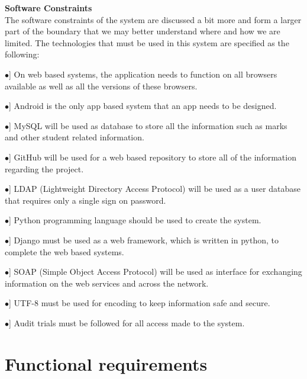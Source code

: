 \documentclass[12pt, a4paper]{scrartcl}
\newcommand{\tab}[1]{\hspace{.05\textwidth}\rlap{#1}}
\begin{document}
				\textbf{Software Constraints}\\
				The software constraints of the system are discussed a bit more and form a larger part of the boundary that we may better understand where and how we are limited. The technologies that must be used in this system are specified as the following:
				\begin{description}
					\item \tab [$\bullet$] On web based systems, the application needs to function on all browsers available as well as all the versions of these browsers.
					\item \tab [$\bullet$] Android is the only app based system that an app needs to be designed.
					\item \tab [$\bullet$] MySQL will be used as database to store all the information such as marks and other student related information.
					\item \tab [$\bullet$] GitHub will be used for a web based repository to store all of the information regarding the project.
					\item \tab [$\bullet$] LDAP (Lightweight Directory Access Protocol) will be used as a user database that requires only a single sign on password.
					\item \tab [$\bullet$] Python programming language should be used to create the system.
					\item \tab [$\bullet$] Django must be used as a web framework, which is written in python, to complete the web based systems.
					\item \tab [$\bullet$] SOAP (Simple Object Access Protocol) will be used as interface for exchanging information on the web services and across the network.
					\item \tab [$\bullet$] UTF-8 must be used for encoding to keep information safe and secure.
					\item \tab [$\bullet$] Audit trials must be followed for all access made to the system.	
				\end{description}
		\section{Functional requirements}
\end{document}
